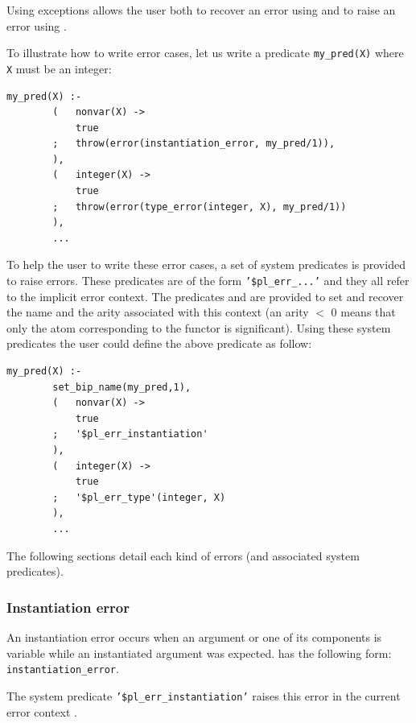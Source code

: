 Using exceptions allows the user both to recover an error using
  and to raise an error using
 .

To illustrate how to write error cases, let us write a predicate
\texttt{my\_pred(X)} where \texttt{X} must be an integer:

\begin{Code}
\begin{verbatim}
my_pred(X) :-
        (   nonvar(X) ->
            true
        ;   throw(error(instantiation_error, my_pred/1)),
        ),
        (   integer(X) ->
            true
        ;   throw(error(type_error(integer, X), my_pred/1))
        ),
        ...
\end{verbatim}
\end{Code}

To help the user to write these error cases, a set of system predicates is
provided to raise errors. These predicates are of the form
\texttt{'\$pl\_err\_...'} and they all refer to the implicit error context.
The predicates   and
  are provided to
set and recover the name and the arity associated with this context (an arity
$<$ 0 means that only the atom corresponding to the functor is significant).
Using these system predicates the user could define the above predicate as
follow:

\begin{Code}
\begin{verbatim}
my_pred(X) :-
        set_bip_name(my_pred,1),
        (   nonvar(X) ->
            true
        ;   '$pl_err_instantiation'
        ),
        (   integer(X) ->
            true
        ;   '$pl_err_type'(integer, X)
        ),
        ...
\end{verbatim}
\end{Code}

The following sections detail each kind of errors (and associated system
predicates).

\subsubsection{Instantiation error}
\label{Instantiation-error}
An instantiation error occurs when an argument or one of its components is
variable while an instantiated argument was expected.
 has the following form:
\texttt{instantiation\_error}.

The system predicate \texttt{'\$pl\_err\_instantiation'} raises this
error in the current error context .


